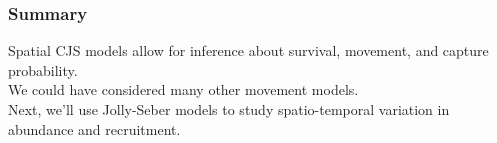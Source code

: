 \documentclass[color=usenames,dvipsnames]{beamer}\usepackage[]{graphicx}\usepackage[]{color}
\begin{document}
\begin{frame}
  \frametitle{Summary}
  \large
  Spatial CJS models allow for inference about survival,
  movement, and capture probability. \\
  \pause \vfill
  We could have considered many other movement models. \\
  \pause \vfill
  Next, we'll use Jolly-Seber models to study spatio-temporal
  variation in abundance and recruitment. \\
\end{frame}



\end{document}
